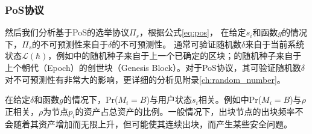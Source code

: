 \subsubsection{PoS协议}

然后我们分析基于PoS的选举协议$\Pi_s$，根据公式\ref{eq:pos}，%
在给定$s_i$和函数$g$的情况下，$\Pi_s$的不可预测性来自于$\delta$的不可预测性。%
通常可验证随机数$\delta$来自于当前系统状态$\mathcal{L}(\hbar)$，例如\cite{gilad2017algorand}中的随机种子来自于上一个已确定的区块；\cite{david2018ouroboros}的随机种子来自于上个朝代（Epoch）的创世块（Genesis Block）。对于PoS协议，其可验证随机数$\delta$对不可预测性有非常大的影响，更详细的分析见附录\ref{ch:random_number}。



在给定$\delta$和函数$g$的情况下，Pr($M_i=B$)与用户状态$s_i$相关。例如\cite{gilad2017algorand}中Pr($M_i=B$)与$\rho$正相关，$\rho$为节点$p_i$的资产占总资产的比例。一般情况下，出块节点的出块频率不会随着其资产增加而无限上升，但可能使其连续出块，而产生某些安全问题\cite{david2018ouroboros}。







